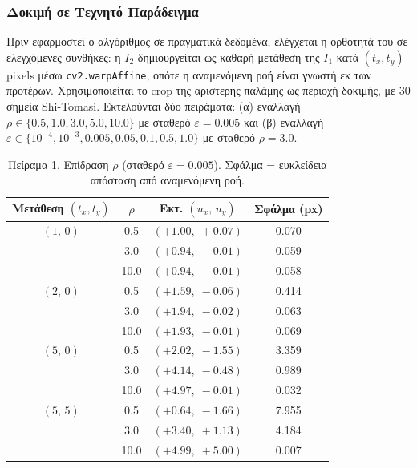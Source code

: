 \documentclass[12pt]{article}
\begin{document}
\subsubsection*{Δοκιμή σε Τεχνητό Παράδειγμα}

\hspace{0.6cm}Πριν εφαρμοστεί ο αλγόριθμος σε πραγματικά δεδομένα, ελέγχεται η ορθότητά του σε ελεγχόμενες συνθήκες: η $I_2$ δημιουργείται ως καθαρή μετάθεση της $I_1$ κατά $(t_x, t_y)$ pixels μέσω \texttt{cv2.warpAffine}, οπότε η αναμενόμενη ροή είναι γνωστή εκ των προτέρων. Χρησιμοποιείται το crop της αριστερής παλάμης ως περιοχή δοκιμής, με 30 σημεία Shi-Tomasi. Εκτελούνται δύο πειράματα: (α) εναλλαγή $\rho \in \{0.5, 1.0, 3.0, 5.0, 10.0\}$ με σταθερό $\varepsilon=0.005$ και (β) εναλλαγή $\varepsilon \in \{10^{-4}, 10^{-3}, 0.005, 0.05, 0.1, 0.5, 1.0\}$ με σταθερό $\rho=3.0$.

\begin{table}[H]
\centering
\small
\begin{tabular}{@{}cccc@{}}
\toprule
\textbf{Μετάθεση $(t_{x}, t_{y})$} & \textbf{$\rho$} & \textbf{Εκτ. $(u_x,\,u_y)$} & \textbf{Σφάλμα (px)} \\
\midrule
$(1,\,0)$ & 0.5  & $(+1.00,\;+0.07)$ & 0.070 \\
          & 3.0  & $(+0.94,\;-0.01)$ & 0.059 \\
          & 10.0 & $(+0.94,\;-0.01)$ & 0.058 \\
\midrule
$(2,\,0)$ & 0.5  & $(+1.59,\;-0.06)$ & 0.414 \\
          & 3.0  & $(+1.94,\;-0.02)$ & 0.063 \\
          & 10.0 & $(+1.93,\;-0.01)$ & 0.069 \\
\midrule
$(5,\,0)$ & 0.5  & $(+2.02,\;-1.55)$ & 3.359 \\
          & 3.0  & $(+4.14,\;-0.48)$ & 0.989 \\
          & 10.0 & $(+4.97,\;-0.01)$ & 0.032 \\
\midrule
$(5,\,5)$ & 0.5  & $(+0.64,\;-1.66)$ & 7.955 \\
          & 3.0  & $(+3.40,\;+1.13)$ & 4.184 \\
          & 10.0 & $(+4.99,\;+5.00)$ & 0.007 \\
\bottomrule
\end{tabular}
\caption{Πείραμα 1. Επίδραση $\rho$ (σταθερό $\varepsilon=0.005$). Σφάλμα = ευκλείδεια απόσταση από αναμενόμενη ροή.}
\label{tab:lk_rho}
\end{table}
\end{document}

